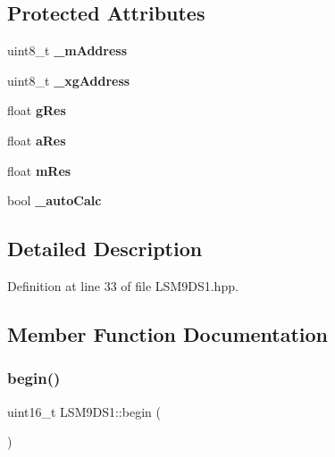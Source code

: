 \subsection*{Protected Attributes}
\begin{DoxyCompactItemize}
\item 
\mbox{\label{classLSM9DS1_a7141933a2ccde95976e4eecd598ecb17}} 
uint8\+\_\+t {\bfseries \+\_\+m\+Address}
\item 
\mbox{\label{classLSM9DS1_ac78b7fab605570a16433a4636f91451e}} 
uint8\+\_\+t {\bfseries \+\_\+xg\+Address}
\item 
\mbox{\label{classLSM9DS1_a2d8654ebb35177088a67e67a944bd998}} 
float {\bfseries g\+Res}
\item 
\mbox{\label{classLSM9DS1_acdc1f9b300b3c349e17dd21c9bb37c40}} 
float {\bfseries a\+Res}
\item 
\mbox{\label{classLSM9DS1_aac7ae43adf399e8052464b966aec8472}} 
float {\bfseries m\+Res}
\item 
\mbox{\label{classLSM9DS1_a8460d00ea0bb496c5d49190a34e54588}} 
bool {\bfseries \+\_\+auto\+Calc}
\end{DoxyCompactItemize}


\subsection{Detailed Description}


Definition at line 33 of file L\+S\+M9\+D\+S1.\+hpp.



\subsection{Member Function Documentation}
\mbox{\label{classLSM9DS1_a8728e560c76bd120b3711af15a6ecbd6}} 
\subsubsection{\texorpdfstring{begin()}{begin()}}
{\footnotesize\ttfamily uint16\+\_\+t L\+S\+M9\+D\+S1\+::begin (\begin{DoxyParamCaption}{ }\end{DoxyParamCaption})}

